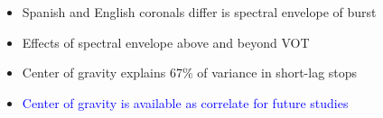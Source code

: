 \documentclass[a0paper,portrait,columns=2]{baposter}
\begin{document}
\begin{poster}
{\vspace{.1in}

\begin{itemize}
	\item Spanish and English coronals differ is spectral envelope of burst
	\item Effects of spectral envelope above and beyond VOT
	\item Center of gravity explains 67\% of variance in short-lag stops 
	\item \textcolor{blue}{Center of gravity is available as correlate for future studies}
\end{itemize}

\vspace{.1in}
}











\end{poster}
\end{document}
